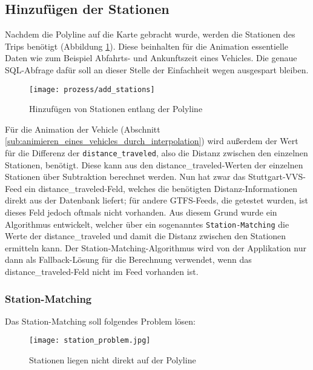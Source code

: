\subsection{Hinzufügen der Stationen}
\label{sub:hinzufügen_der_stationen}
  Nachdem die Polyline auf die Karte gebracht wurde, werden die Stationen des Trips benötigt (Abbildung \ref{fig:prozess/add_stations}). Diese beinhalten für die Animation essentielle Daten wie zum Beispiel Abfahrts- und Ankunftszeit eines Vehicles. Die genaue SQL-Abfrage dafür soll an dieser Stelle der Einfachheit wegen ausgespart bleiben.

  \begin{figure}[htbp]
    \begin{center}
      \texttt{[image: prozess/add\_stations]}
      \caption{Hinzufügen von Stationen entlang der Polyline}
      \label{fig:prozess/add_stations}
    \end{center}
  \end{figure}

  Für die Animation der Vehicle (Abschnitt \ref{sub:animieren_eines_vehicles_durch_interpolation}) wird außerdem der Wert für die Differenz der \texttt{distance\_traveled}, also die Distanz zwischen den einzelnen Stationen, benötigt. Diese kann aus den distance\_traveled-Werten der einzelnen Stationen über Subtraktion berechnet werden. Nun hat zwar das Stuttgart-VVS-Feed ein distance\_traveled-Feld, welches die benötigten Distanz-Informationen direkt aus der Datenbank liefert; für andere GTFS-Feeds, die getestet wurden, ist dieses Feld jedoch oftmals nicht vorhanden. Aus diesem Grund wurde ein Algorithmus entwickelt, welcher über ein sogenanntes \texttt{Station-Matching} die Werte der distance\_traveled und damit die Distanz zwischen den Stationen ermitteln kann. Der Station-Matching-Algorithmus wird von der Applikation nur dann als Fallback-Lösung für die Berechnung verwendet, wenn das distance\_traveled-Feld nicht im Feed vorhanden ist.

  \subsubsection*{Station-Matching}
  \label{ssub:station_matching}
    Das Station-Matching soll folgendes Problem lösen:

    \begin{figure}[htbp]
      \begin{center}
        \texttt{[image: station\_problem.jpg]}
        \caption{Stationen liegen nicht direkt auf der Polyline}
        \label{fig:station_problem}
      \end{center}
    \end{figure}
    
